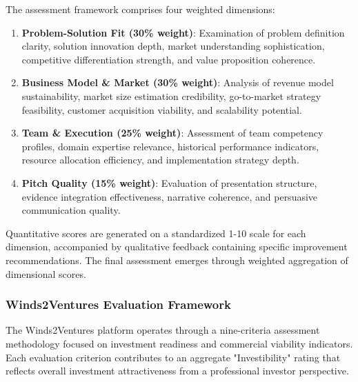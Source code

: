 The assessment framework comprises four weighted dimensions:
\begin{enumerate}
    \item \textbf{Problem-Solution Fit (30\% weight)}: Examination of problem definition clarity, solution innovation depth, market understanding sophistication, competitive differentiation strength, and value proposition coherence.

    \item \textbf{Business Model \& Market (30\% weight)}: Analysis of revenue model sustainability, market size estimation credibility, go-to-market strategy feasibility, customer acquisition viability, and scalability potential.

    \item \textbf{Team \& Execution (25\% weight)}: Assessment of team competency profiles, domain expertise relevance, historical performance indicators, resource allocation efficiency, and implementation strategy depth.

    \item \textbf{Pitch Quality (15\% weight)}: Evaluation of presentation structure, evidence integration effectiveness, narrative coherence, and persuasive communication quality.
\end{enumerate}

Quantitative scores are generated on a standardized 1-10 scale for each dimension, accompanied by qualitative feedback containing specific improvement recommendations. The final assessment emerges through weighted aggregation of dimensional scores.

\subsubsection{Winds2Ventures Evaluation Framework}

The Winds2Ventures platform operates through a nine-criteria assessment methodology focused on investment readiness and commercial viability indicators. Each evaluation criterion contributes to an aggregate "Investibility" rating that reflects overall investment attractiveness from a professional investor perspective.

